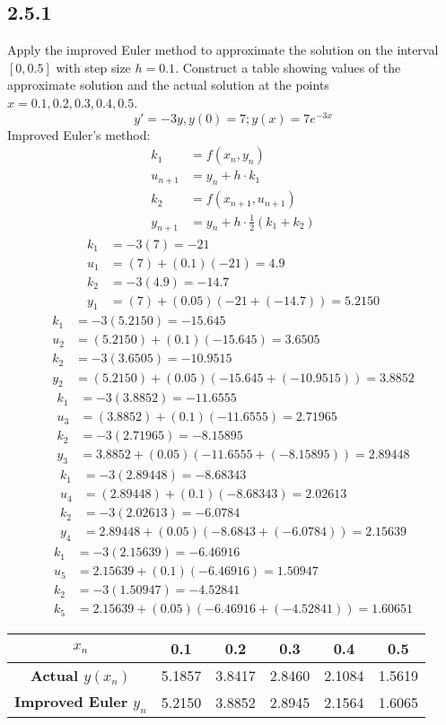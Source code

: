 \documentclass{article}
\begin{document}
\subsection{2.5.1}
Apply the improved Euler method to approximate the solution on the interval $ [0, 0.5] $ with step size $ h = 0.1 $. Construct a table showing values of the approximate solution and the actual solution at the points $ x = 0.1, 0.2, 0.3, 0.4, 0.5 $.
$$ y' = -3y, y(0) = 7; y(x) = 7e^{-3x} $$
Improved Euler's method:
\begin{align*}
	k_1 & = f(x_n,y_n) \\
	u_{n+1} & = y_n + h \cdot k_1 \\
	k_2 & = f(x_{n+1},u_{n+1}) \\
	y_{n+1} & = y_n + h \cdot \frac{1}{2}(k_1 + k_2)
\end{align*}
\begin{align*}
	k_1 & = -3(7) = -21 \\
	u_1 & = (7) + (0.1)(-21) = 4.9 \\
	k_2 & = -3(4.9) = -14.7 \\
	y_1 & = (7) + (0.05)(-21 + (-14.7)) = 5.2150
\end{align*}
\begin{align*}
	k_1 & = -3(5.2150) = -15.645 \\
	u_2 & = (5.2150) + (0.1)(-15.645) = 3.6505 \\
	k_2 & = -3(3.6505) = -10.9515 \\
	y_2 & = (5.2150) + (0.05)(-15.645+(-10.9515)) = 3.8852
\end{align*}
\begin{align*}
	k_1 & = -3(3.8852) = -11.6555 \\
	u_3 & = (3.8852) + (0.1)(-11.6555) = 2.71965 \\
	k_2 & = -3(2.71965) = -8.15895 \\
	y_3 & = 3.8852 + (0.05)(-11.6555 + (-8.15895)) = 2.89448
\end{align*}
\begin{align*}
	k_1 & = -3(2.89448) = -8.68343 \\
	u_4 & = (2.89448) + (0.1)(-8.68343) = 2.02613 \\
	k_2 & = -3(2.02613) = -6.0784 \\
	y_4 & = 2.89448 + (0.05)(-8.6843 + (-6.0784)) = 2.15639
\end{align*}
\begin{align*}
	k_1 & = -3(2.15639) = -6.46916 \\
	u_5 & = 2.15639 + (0.1)(-6.46916) = 1.50947 \\
	k_2 & = -3(1.50947) = -4.52841 \\
	k_5 & = 2.15639 + (0.05)(-6.46916 + (-4.52841)) = 1.60651
\end{align*}
\begin{tabular}{ | c | c | c | c | c | c | }
	\textbf{$ x_n $} & 0.1 & 0.2 & 0.3 & 0.4 & 0.5 \\
	\hline
	\textbf{Actual $ y \left( x_n \right) $} & 5.1857 & 3.8417 & 2.8460 & 2.1084 & 1.5619 \\
	\hline
	\textbf{Improved Euler $ y_n $} & 5.2150 & 3.8852 & 2.8945 & 2.1564 & 1.6065
\end{tabular}
\end{document}
